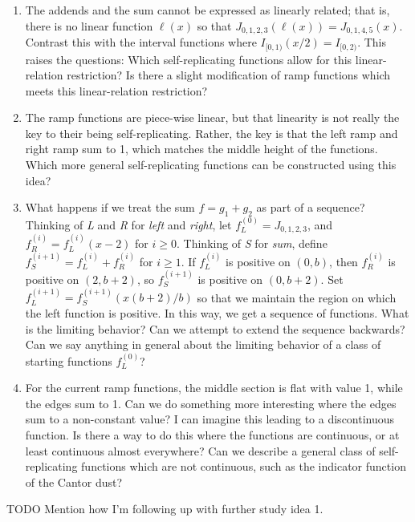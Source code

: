 \documentclass[20pt,]{extarticle}
\providecommand{\tightlist}{%
  \setlength{\itemsep}{0pt}\setlength{\parskip}{0pt}}
\begin{document}
\begin{enumerate}
\def\labelenumi{\arabic{enumi}.}
\tightlist
\item
  The addends and the sum cannot be expressed as linearly related; that
  is, there is no linear function \(\ell(x)\) so that
  \(J_{0, 1, 2, 3}(\ell(x)) = J_{0, 1, 4, 5}(x)\). Contrast this with
  the interval functions where \(I_{[0, 1)}(x / 2) = I_{[0, 2)}\). This
  raises the questions: Which self-replicating functions allow for this
  linear-relation restriction? Is there a slight modification of ramp
  functions which meets this linear-relation restriction?
\item
  The ramp functions are piece-wise linear, but that linearity is not
  really the key to their being self-replicating. Rather, the key is
  that the left ramp and right ramp sum to 1, which matches the middle
  height of the functions. Which more general self-replicating functions
  can be constructed using this idea?
\item
  What happens if we treat the sum \(f = g_1 + g_2\) as part of a
  sequence? Thinking of \emph{L} and \emph{R} for \emph{left} and
  \emph{right}, let \(f^{(0)}_L = J_{0, 1, 2, 3}\), and
  \(f^{(i)}_R = f^{(i)}_L(x-2)\) for \(i \ge 0\). Thinking of \emph{S}
  for \emph{sum}, define \(f^{(i+1)}_S = f^{(i)}_L + f^{(i)}_R\) for
  \(i \ge 1\). If \(f^{(i)}_L\) is positive on \((0, b)\), then
  \(f^{(i)}_R\) is positive on \((2, b + 2)\), so \(f^{(i+1)}_S\) is
  positive on \((0, b + 2)\). Set
  \(f^{(i+1)}_L = f^{(i+1)}_S(x (b + 2) / b)\) so that we maintain the
  region on which the left function is positive. In this way, we get a
  sequence of functions. What is the limiting behavior? Can we attempt
  to extend the sequence backwards? Can we say anything in general about
  the limiting behavior of a class of starting functions \(f^{(0)}_L\)?
\item
  For the current ramp functions, the middle section is flat with value
  1, while the edges sum to 1. Can we do something more interesting
  where the edges sum to a non-constant value? I can imagine this
  leading to a discontinuous function. Is there a way to do this where
  the functions are continuous, or at least continuous almost
  everywhere? Can we describe a general class of self-replicating
  functions which are not continuous, such as the indicator function of
  the Cantor dust?
\end{enumerate}

TODO Mention how I'm following up with further study idea 1.
\end{document}
